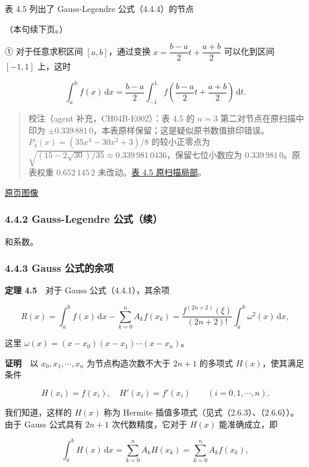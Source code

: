 \documentclass[
  10pt,
  fontset=fandol]{ctexart}
\begin{document}
表 4.5 列出了 Gauss-Legendre 公式（4.4.4）的节点

（本句续下页。）

① 对于任意求积区间 \([a,b]\)，通过变换 \(x=\dfrac{b-a}{2}t+\dfrac{a+b}{2}\) 可以化到区间 \([-1,1]\) 上，这时

\[
\int_a^b f(x)\,\mathrm{d}x
=\frac{b-a}{2}\int_{-1}^{1}f\left(\frac{b-a}{2}t+\frac{a+b}{2}\right)\,\mathrm{d}t.
\]

\begin{quote}
校注（agent 补充，CH04B-E002）：表 4.5 的 \(n=3\) 第二对节点在原扫描中印为 \(\pm0.339\,881\,0\)，本表原样保留；这是疑似原书数值排印错误。\(P_4(x)=(35x^4-30x^2+3)/8\) 的较小正零点为 \(\sqrt{(15-2\sqrt{30})/35}\approx0.339\,981\,0436\)，保留七位小数应为 \(0.339\,981\,0\)。原表权重 \(0.652\,145\,2\) 未改动。\href{../assets/ch04b/review-table-4-5.png}{表 4.5 原扫描局部}。
\end{quote}

\href{../../source-images/pdf-109.jpeg}{原页图像}

\subsubsection{4.4.2 Gauss-Legendre 公式（续）}\label{gauss-legendre-ux516cux5f0fux7eed}

和系数。

\subsubsection{4.4.3 Gauss 公式的余项}\label{gauss-ux516cux5f0fux7684ux4f59ux9879}

\textbf{定理 4.5}　对于 Gauss 公式（4.4.1），其余项

\[
R(x)=\int_a^b f(x)\,\mathrm{d}x-\sum_{k=0}^{n}A_kf(x_k)
=\frac{f^{(2n+2)}(\xi)}{(2n+2)!}\int_a^b\omega^2(x)\,\mathrm{d}x,
\tag{4.4.5}
\]

这里 \(\omega(x)=(x-x_0)(x-x_1)\cdots(x-x_n)\)。

\textbf{证明}　以 \(x_0,x_1,\cdots,x_n\) 为节点构造次数不大于 \(2n+1\) 的多项式 \(H(x)\)，使其满足条件

\[
H(x_i)=f(x_i),\quad H'(x_i)=f'(x_i)\qquad(i=0,1,\cdots,n).
\]

我们知道，这样的 \(H(x)\) 称为 Hermite 插值多项式（见式（2.6.3）、（2.6.6））。由于 Gauss 公式具有 \(2n+1\) 次代数精度，它对于 \(H(x)\) 能准确成立，即

\[
\int_a^b H(x)\,\mathrm{d}x
=\sum_{k=0}^{n}A_kH(x_k)=\sum_{k=0}^{n}A_kf(x_k),
\]
\end{document}
